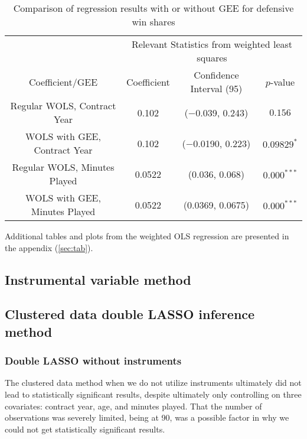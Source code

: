 \documentclass[12pt]{article}
\begin{document}
	\begin{table}[!htbp]
		\centering
		\caption{Comparison of regression results with or without GEE for defensive win shares}
		\label{geelmcomparisond} 
		\begin{tabular}{*4c}
			\toprule
			& \multicolumn{3}{c}{Relevant Statistics from weighted least squares} \\
			\cmidrule(lr){2-4}
			Coefficient/GEE & Coefficient  & Confidence Interval (95) & $p$-value \\
			\midrule
			Regular WOLS, Contract Year & 0.102       & ($-$0.039, 0.243) & $0.156$       \\
			WOLS with GEE, Contract Year & 0.102      & ($-$0.0190, 0.223)       & $0.09829^{*}$ \\
			Regular WOLS, Minutes Played & 0.0522       & (0.036, 0.068) & $0.000^{***}$ \\
			WOLS with GEE, Minutes Played & 0.0522 & (0.0369, 0.0675)       & $0.000^{***}$       \\
			\bottomrule
		\end{tabular}
	\end{table}
	
	Additional tables and plots from the weighted OLS regression are presented in the appendix (\ref{sec:tab}).
	
	\pagebreak
	
	\subsection{Instrumental variable method}
	
	\subsection{Clustered data double LASSO inference method}
	
	\subsubsection{Double LASSO without instruments}
	
	The clustered data method when we do not utilize instruments ultimately did not lead to statistically significant results, despite ultimately only controlling on three covariates: contract year, age, and minutes played. That the number of observations was severely limited, being at 90, was a possible factor in why we could not get statistically significant results.
	
\end{document}

